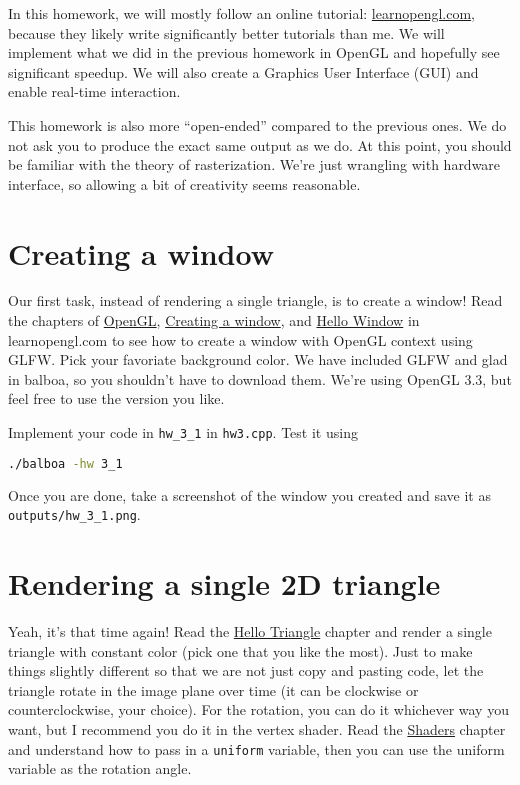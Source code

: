 In this homework, we will mostly follow an online tutorial: \href{https://learnopengl.com/}{learnopengl.com}, because they likely write significantly better tutorials than me. We will implement what we did in the previous homework in OpenGL and hopefully see significant speedup. We will also create a Graphics User Interface (GUI) and enable real-time interaction.

This homework is also more ``open-ended'' compared to the previous ones. We do not ask you to produce the exact same output as we do. At this point, you should be familiar with the theory of rasterization. We're just wrangling with hardware interface, so allowing a bit of creativity seems reasonable.

\section{Creating a window}

Our first task, instead of rendering a single triangle, is to create a window! Read the chapters of \href{https://learnopengl.com/Getting-started/OpenGL}{OpenGL}, \href{https://learnopengl.com/Getting-started/Creating-a-window}{Creating a window}, and \href{https://learnopengl.com/Getting-started/Hello-Window}{Hello Window} in learnopengl.com to see how to create a window with OpenGL context using GLFW. Pick your favoriate background color. We have included GLFW and glad in balboa, so you shouldn't have to download them. We're using OpenGL 3.3, but feel free to use the version you like.

Implement your code in \lstinline{hw_3_1} in \lstinline{hw3.cpp}. Test it using
\begin{lstlisting}[language=bash]
./balboa -hw 3_1
\end{lstlisting}

Once you are done, take a screenshot of the window you created and save it as \lstinline{outputs/hw_3_1.png}.

\section{Rendering a single 2D triangle}

Yeah, it's that time again! Read the \href{https://learnopengl.com/Getting-started/Hello-Triangle}{Hello Triangle} chapter and render a single triangle with constant color (pick one that you like the most). Just to make things slightly different so that we are not just copy and pasting code, let the triangle rotate in the image plane over time (it can be clockwise or counterclockwise, your choice). For the rotation, you can do it whichever way you want, but I recommend you do it in the vertex shader. Read the \href{https://learnopengl.com/Getting-started/Shaders}{Shaders} chapter and understand how to pass in a \lstinline{uniform} variable, then you can use the uniform variable as the rotation angle.  

